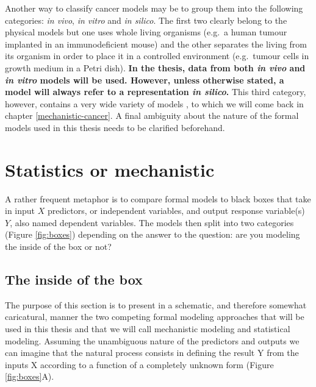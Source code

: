 \documentclass[a4paper,12pt,twoside,onecolumn,openright,final,oldfontcommands]{memoir}
\begin{document}
Another way to classify cancer models may be to group them into the
following categories: \emph{in vivo}, \emph{in vitro} and \emph{in
silico}. The first two clearly belong to the physical models but one
uses whole living organisms (e.g.~a human tumour implanted in an
immunodeficient mouse) and the other separates the living from its
organism in order to place it in a controlled environment (e.g.~tumour
cells in growth medium in a Petri dish). \textbf{In the thesis, data
from both \emph{in vivo} and \emph{in vitro} models will be used.
However, unless otherwise stated, a model will always refer to a
representation \emph{in silico}.} This third category, however, contains
a very wide variety of models \citep{deisboeck2009silico}, to which we
will come back in chapter \ref{mechanistic-cancer}. A final ambiguity
about the nature of the formal models used in this thesis needs to be
clarified beforehand.

\section{Statistics or mechanistic}\label{stat-mech}

A rather frequent metaphor is to compare formal models to black boxes
that take in input \(X\) predictors, or independent variables, and
output response variable(s) \(Y\), also named dependent variables. The
models then split into two categories (Figure \ref{fig:boxes}) depending
on the answer to the question: are you modeling the inside of the box or
not?

\subsection{The inside of the box}\label{the-inside-of-the-box}

The purpose of this section is to present in a schematic, and therefore
somewhat caricatural, manner the two competing formal modeling
approaches that will be used in this thesis and that we will call
mechanistic modeling and statistical modeling. Assuming the unambiguous
nature of the predictors and outputs we can imagine that the natural
process consists in defining the result Y from the inputs X according to
a function of a completely unknown form (Figure \ref{fig:boxes}A).
\end{document}
